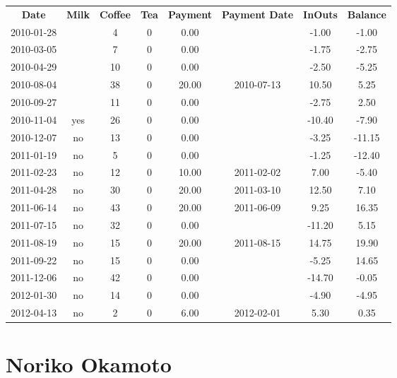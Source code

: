 \begin{center}
\begin{tabular}{cccccccc}
\textbf{Date} & \textbf{Milk} & \textbf{Coffee} & \textbf{Tea} & \textbf{Payment} & \textbf{Payment Date} & \textbf{InOuts} & \textbf{Balance} \\
2010-01-28 &  &  4 & 0 &  0.00 &  &  -1.00 &  -1.00\\ 
2010-03-05 &  &  7 & 0 &  0.00 &  &  -1.75 &  -2.75\\ 
2010-04-29 &  & 10 & 0 &  0.00 &  &  -2.50 &  -5.25\\ 
2010-08-04 &  & 38 & 0 & 20.00 & 2010-07-13 &  10.50 &   5.25\\ 
2010-09-27 &  & 11 & 0 &  0.00 &  &  -2.75 &   2.50\\ 
2010-11-04 & yes & 26 & 0 &  0.00 &  & -10.40 &  -7.90\\ 
2010-12-07 & no & 13 & 0 &  0.00 &  &  -3.25 & -11.15\\ 
2011-01-19 & no &  5 & 0 &  0.00 &  &  -1.25 & -12.40\\ 
2011-02-23 & no & 12 & 0 & 10.00 & 2011-02-02 &   7.00 &  -5.40\\ 
2011-04-28 & no & 30 & 0 & 20.00 & 2011-03-10 &  12.50 &   7.10\\ 
2011-06-14 & no & 43 & 0 & 20.00 & 2011-06-09 &   9.25 &  16.35\\ 
2011-07-15 & no & 32 & 0 &  0.00 &  & -11.20 &   5.15\\ 
2011-08-19 & no & 15 & 0 & 20.00 & 2011-08-15 &  14.75 &  19.90\\ 
2011-09-22 & no & 15 & 0 &  0.00 &  &  -5.25 &  14.65\\ 
2011-12-06 & no & 42 & 0 &  0.00 &  & -14.70 &  -0.05\\ 
2012-01-30 & no & 14 & 0 &  0.00 &  &  -4.90 &  -4.95\\ 
2012-04-13 & no &  2 & 0 &  6.00 & 2012-02-01 &   5.30 &   0.35
\end{tabular}
\end{center}

\section{Noriko Okamoto}

